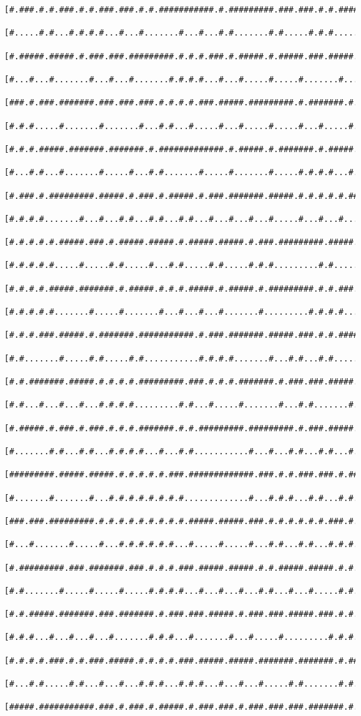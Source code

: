 \documentclass[a4paper,10pt,ngerman]{scrartcl}
\begin{document}
\begin{lstlisting}[frame=tb]
 [#.###.#.#.###.#.#.###.###.#.#.###########.#.#########.###.###.#.#.#####.#.#.#####]
 [#.....#.#...#.#.#.#...#...#.......#...#...#.#.......#.#.....#.#.#.....#.#.#...#.#]
 [#.#####.#####.#.###.###.#########.#.#.#.###.#.#####.#.#####.###.#####.#.#####.#.#]
 [#...#...#.......#...#...#.......#.#.#.#...#...#.....#.....#.......#...#.......#.#]
 [###.#.###.#######.###.###.###.#.#.#.#.###.#####.#########.#.#######.#.#########.#]
 [#.#.#.....#.......#.......#...#.#...#.....#...#.....#.....#...#.....#.#...#.....#]
 [#.#.#.#####.#######.#######.#.#############.#.#####.#.#######.#.#####.#.#.#.#####]
 [#...#.#...#.......#.....#...#.#.......#.....#.......#.....#.#.#.#...#...#.#.....#]
 [#.###.#.#########.#####.#.###.#.#####.#.###.#######.#####.#.#.#.#.#.#####.#####.#]
 [#.#.#.#.......#...#...#.#...#.#...#.#...#...#...#...#.....#...#...#...#.........#]
 [#.#.#.#.#.#####.###.#.#####.#####.#.#####.#####.#.###.#########.#####.###########]
 [#.#.#.#.#.....#.....#.#.....#...#.#.....#.#.....#.#.#.........#.#.....#.........#]
 [#.#.#.#.#####.#######.#.#####.#.#.#.#####.#.#####.#.#########.#.#.###.#.#######.#]
 [#.#.#.#.#.......#.....#.......#...#...#...#.......#.........#.#.#.#...#.#...#...#]
 [#.#.#.###.#####.#.#######.###########.#.###.#######.#####.###.#.#.#####.#.#.#.#.#]
 [#.#.......#.....#.#.....#.#...........#.#.#.#.......#...#.#...#.#.....#.#.#.#.#.#]
 [#.#.#######.#####.#.#.#.#.#########.###.#.#.#.#######.#.###.###.#####.#.#.#.#.#.#]
 [#.#...#...#...#...#.#.#.#.........#.#...#.....#.......#...#.#.......#.#...#.#.#.#]
 [#.#####.#.###.#.###.#.#.#.#######.#.#.#########.#########.#.###.#####.#.#####.###]
 [#.......#.#...#.#...#.#.#.#...#...#.#...........#...#...#.#...#.#...#...#...#...#]
 [#########.#####.#####.#.#.#.#.#.###.#############.###.#.#.###.###.#.#####.#.###.#]
 [#.......#.......#...#.#.#.#.#.#.#.#.............#...#.#.#...#.#...#.#.....#.#...#]
 [###.###.#########.#.#.#.#.#.#.#.#.#.#####.#####.###.#.#.#.#.#.#.###.#.#####.#.#.#]
 [#...#.......#.....#...#.#.#.#.#.#...#.....#.....#...#.#...#.#...#.#.#.#...#...#.#]
 [#.#########.###.#######.###.#.#.#.###.#####.#####.#.#.#####.#####.#.#.#.#.#######]
 [#.#.......#.....#.....#.....#.#.#.#...#...#...#...#.#...#...#.....#.#...#.#.....#]
 [#.#.#####.#######.###.#######.#.###.###.#####.#.###.###.#####.###.#.#.###.#.###.#]
 [#.#.#...#...#...#...#.......#.#.#...#.......#...#.....#.........#.#.#...#...#.#.#]
 [#.#.#.#.###.#.#.###.#####.#.#.#.#.###.#####.#####.#######.#######.#.###.#####.#.#]
 [#...#.#.....#.#...#...#...#.#.#...#.#.#...#...#...#.....#.#.......#.#.#.....#.#.#]
 [#####.###########.###.#.###.#.#####.#.###.###.#.###.###.###.#######.#.#####.#.#.#]

\end{lstlisting}
\end{document}
